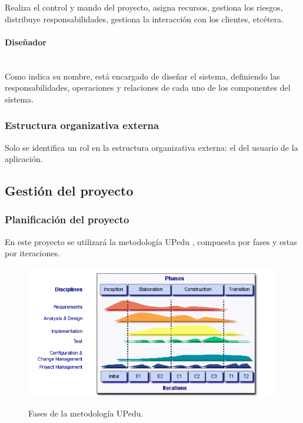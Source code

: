 \documentclass[twoside]{report}
\begin{document}
Realiza el control y mando del proyecto, asigna recursos, gestiona los riesgos, distribuye responsabilidades, gestiona la interacción con los clientes, etcétera.

\paragraph{Diseñador}\mbox{}\\

Como indica su nombre, está encargado de diseñar el sistema, definiendo las responsabilidades, operaciones y relaciones de cada uno de los componentes del sistema.

\subsubsection{Estructura organizativa externa}
Solo se identifica un rol en la estructura organizativa externa: el del usuario de la aplicación. 

\subsection{Gestión del proyecto}
\subsubsection{Planificación del proyecto}
En este proyecto se utilizará la metodología UPedu \cite{upedu}, compuesta por fases y estas por iteraciones.

\begin{figure}[H]
\begin{center}
\includegraphics[scale=0.75]{images/upeduFases}
\caption{Fases de la metodología UPedu.} 
\label{upeduChart}
\cite{upedu}
\end{center}
\end{figure}
\end{document}
